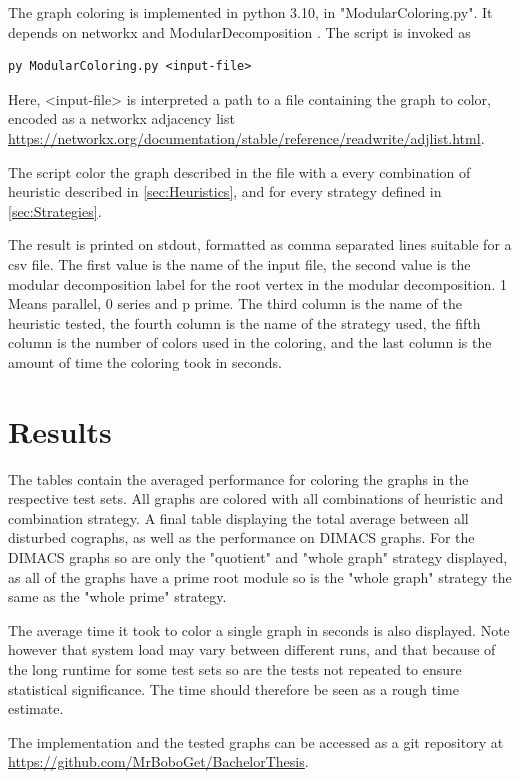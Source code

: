 \documentclass[a4paper]{article}
\begin{document}
The graph coloring is implemented in python 3.10, in "ModularColoring.py". 
It depends on networkx \cite{Networkx} and ModularDecomposition \cite{Anna}.
The script is invoked as 
\begin{verbatim}
py ModularColoring.py <input-file> 
\end{verbatim}

Here, <input-file> is interpreted a path to a file containing the graph to color,
encoded as a networkx adjacency list \url{https://networkx.org/documentation/stable/reference/readwrite/adjlist.html}.

The script color the graph described in the file with a every combination of 
heuristic described in \autoref{sec:Heuristics}, and for every strategy 
defined in \autoref{sec:Strategies}.

The result is printed on stdout, formatted as comma separated lines suitable for
a csv file. The first value is the name of the input file, the second value is
the modular decomposition label for the root vertex in the modular
decomposition. 1 Means parallel, 0 series and p prime.  The third column is the
name of the heuristic tested, the fourth column is the name of the strategy
used, the fifth column is the number of colors used in the coloring, and the
last column is the amount of time the coloring took in seconds.

\section{Results}
\label{sec:Result}

The tables contain the averaged performance for coloring the graphs in the
respective test sets. All graphs are colored with all combinations of heuristic
and combination strategy. A final table displaying the total average between
all disturbed cographs, as well as the performance on DIMACS graphs. For the
DIMACS graphs so are only the "quotient" and "whole graph" strategy displayed,
as all of the graphs have a prime root module so is the "whole graph" strategy
the same as the "whole prime" strategy.

The average time it took to color a single graph in seconds is also displayed. Note
however that system load may vary between different runs, and that because of
the long runtime for some test sets so are the tests not repeated to ensure
statistical significance. The time should therefore be seen as a rough time
estimate.

The implementation and the tested graphs can be accessed as a git repository 
at \url{https://github.com/MrBoboGet/BachelorThesis}.
\end{document}
